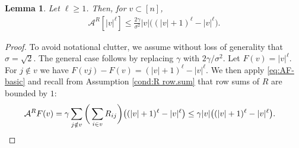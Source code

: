 \documentclass[11pt,reqno]{amsart}
\numberwithin{equation}{section}
\newtheorem{lemma}[theorem]{Lemma}
\theoremstyle{definition}
\def\A{{\mathcal A}}
\begin{document}
\begin{lemma} \label{le:AF-polynomial}
Let $\ell \ge 1$. Then, for $v \subset [n]$,
\begin{align}
		\A^{R}[|v|^\ell] \le \frac{2\gamma}{\sigma^2}   |v|\big((|v|+1)^{\ell}-|v|^\ell\big). \label{pf:polynomial1}
		\end{align}
\end{lemma}
\begin{proof}
To avoid notational clutter, we assume without loss of generality that $\sigma = \sqrt{2}$. The general case follows by replacing $\gamma $ with $2\gamma/\sigma^2$. Let $F(v)=|v|^\ell$.  For $j \notin v$ we have $F(vj) - F(v) = (|v|+1)^\ell - |v|^\ell$.
We then apply \eqref{eq:AF-basic} and recall from Assumption  \eqref{cond:R row.sum}  that row sums of $R$ are bounded by $1$:
		\begin{align*}
			\A^{R}  F(v) & = \gamma \sum_{j \notin v}\bigg( \sum_{i \in v}R_{ij}\bigg)\big((|v|+1)^\ell - |v|^\ell\big)  \le \gamma |v| \big((|v|+1)^\ell - |v|^\ell\big). \qedhere
		\end{align*}  
\end{proof}
\end{document}
